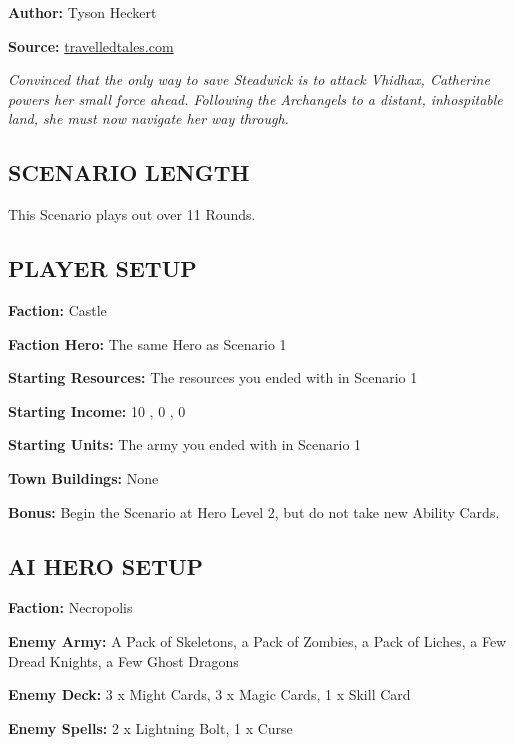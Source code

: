 
\begin{multicols*}{2}

\textbf{Author:} Tyson Heckert

\textbf{Source:} \href{https://travelledtales.com}{travelledtales.com}

\textit{Convinced that the only way to save Steadwick is to attack Vhidhax, Catherine powers her small force ahead. 
Following the Archangels to a distant, inhospitable land, she must now navigate her way through.}

\subsection*{\MakeUppercase{Scenario length}}

This Scenario plays out over 11 Rounds.

\subsection*{\MakeUppercase{Player setup}}

\textbf{Faction:} Castle

\textbf{Faction Hero:} The same Hero as Scenario 1

\textbf{Starting Resources:} The resources you ended with in Scenario 1

\textbf{Starting Income:} 10 , 0 , 0 

\textbf{Starting Units:} The army you ended with in Scenario 1

\textbf{Town Buildings:} None

\textbf{Bonus:} Begin the Scenario at Hero Level 2, but do not take new Ability Cards.

\subsection*{\MakeUppercase{AI Hero setup}}

\textbf{Faction:} Necropolis

\textbf{Enemy Army:} A Pack of Skeletons, a Pack of Zombies, a Pack of Liches, a Few Dread Knights, a Few Ghost Dragons

\textbf{Enemy Deck:} 3 x Might Cards, 3 x Magic Cards, 1 x Skill Card

\textbf{Enemy Spells:} 2 x Lightning Bolt, 1 x Curse


\end{multicols*}
